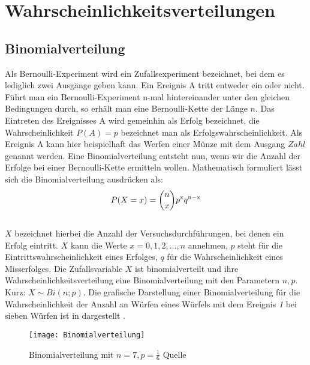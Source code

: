 \section{Wahrscheinlichkeitsverteilungen}
\label{sec.Wahrscheinlichkeitsverteilungen}
\subsection{Binomialverteilung}
\label{sec.Binomialverteilung}
Als Bernoulli-Experiment wird ein Zufallsexperiment bezeichnet, bei dem es lediglich zwei Ausgänge geben kann. Ein Ereignis A tritt entweder ein oder nicht. Führt man ein Bernoulli-Experiment n-mal hintereinander unter den gleichen Bedingungen durch, so erhält man eine Bernoulli-Kette der Länge $n$. Das Eintreten des Ereignisses A wird gemeinhin als Erfolg bezeichnet, die Wahrscheinlichkeit $P(A)=p$ bezeichnet man als Erfolgswahrscheinlichkeit. Als Ereignis A kann hier beispielhaft das Werfen einer Münze mit dem Ausgang $Zahl$ genannt werden. Eine Binomialverteilung entsteht nun, wenn wir die Anzahl der Erfolge bei einer Bernoulli-Kette ermitteln wollen. Mathematisch formuliert lässt sich die Binomialverteilung ausdrücken als:
\begin{equation}
	\label{eq:Binomialverteilung}
	P(X=x) = \binom{n}{x}p^{\mathrm{x}} q^{\mathrm{n-x}}
\end{equation}\\
$X$ bezeichnet hierbei die Anzahl der Versuchsdurchführungen, bei denen ein Erfolg eintritt. $X$ kann die Werte $x = 0,1,2,\dots,n$ annehmen, $p$ steht für die Eintrittswahrscheinlichkeit eines Erfolges, $q$ für die Wahrscheinlichkeit eines Misserfolges. Die Zufallsvariable $X$ ist binomialverteilt und ihre Wahrscheinlichkeitsverteilung eine Binomialverteilung mit den Parametern $n,p$. Kurz: $X \sim Bi(n;p)$. Die grafische Darstellung einer Binomialverteilung für die Wahrscheinlichkeit der Anzahl an Würfen eines Würfels mit dem Ereignis \textit{1} bei sieben Würfen ist in  dargestellt \cite{Teschl.2014}.

\begin{figure}[!ht]
	\begin{center}
		\texttt{[image: Binomialverteilung]}
		\caption{Binomialverteilung mit $n = 7, p = \frac{1}{6}$ Quelle \cite{Teschl.2014}}
		\label{fig.Poisson_Verteilung}
	\end{center}
\end{figure}
